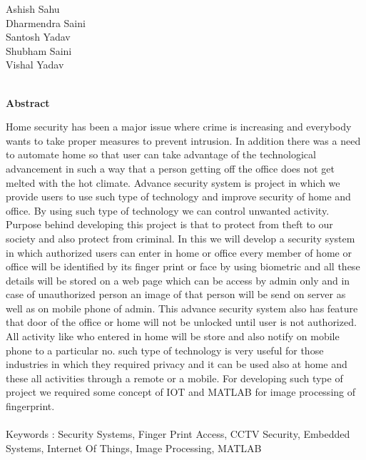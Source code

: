 \documentclass[twoside,a4paper,16pt]{book}
\begin{document}
{{ \vspace{6cm}
Ashish Sahu\\
Dharmendra Saini\\
Santosh Yadav\\
Shubham Saini\\
Vishal Yadav\\ \\}
\newpage
\begin{center}
	\huge{\bf Abstract}
\end{center}
\vspace{1.5cm}
\large Home security has been a major issue where crime is increasing and everybody wants to take proper measures to
prevent intrusion. In addition there was a need to automate home so that user can take advantage of the technological
advancement in such a way that a person getting off the office does not get melted with the hot climate. Advance
security system is project in which we provide users to use such type of technology and improve security of home and
office. By using such type of technology we can control unwanted activity. Purpose behind developing this project is
that to protect from theft to our society and also protect from criminal. In this we will develop a security system in
which authorized users can enter in home or office every member of home or office will be identified by its finger print
or face by using biometric and all these details will be stored on a web page which can be access by admin only and
in case of unauthorized person an image of that person will be send on server as well as on mobile phone of admin.
This advance security system also has feature that door of the office or home will not be unlocked until user is not
authorized. All activity like who entered in home will be store and also notify on mobile phone to a particular no.
such type of technology is very useful for those industries in which they required privacy and it can be used also at
home and these all activities through a remote or a mobile. For developing such type of project we required some
concept of IOT and MATLAB for image processing of fingerprint.\\\\
Keywords : Security Systems, Finger Print Access, CCTV Security, Embedded Systems, Internet Of Things, Image
Processing, MATLAB\\


\newpage
\mainmatter
\tableofcontents
\listoffigures
\listoftables


\contentstyleisdeshed

}
\end{document}
